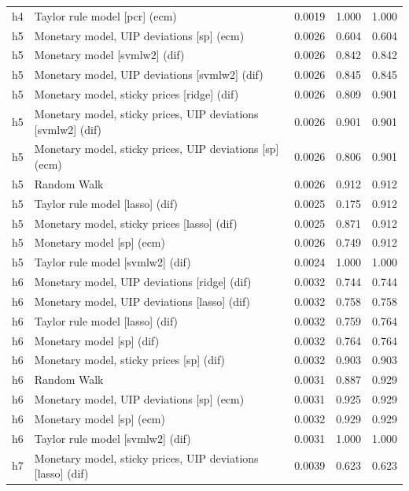\begin{ThreePartTable}
\begin{longtable}[t]{cp{5.5cm}ccc}
h4 & \raggedright Taylor rule model [pcr] (ecm) & 0.0019 & 1.000 & 1.000\\
\addlinespace
h5 & \raggedright Monetary model, UIP deviations [sp] (ecm) & 0.0026 & 0.604 & 0.604\\
h5 & \raggedright Monetary model [svmlw2] (dif) & 0.0026 & 0.842 & 0.842\\
h5 & \raggedright Monetary model, UIP deviations [svmlw2] (dif) & 0.0026 & 0.845 & 0.845\\
h5 & \raggedright Monetary model, sticky prices [ridge] (dif) & 0.0026 & 0.809 & 0.901\\
h5 & \raggedright Monetary model, sticky prices, UIP deviations [svmlw2] (dif) & 0.0026 & 0.901 & 0.901\\
h5 & \raggedright Monetary model, sticky prices, UIP deviations [sp] (ecm) & 0.0026 & 0.806 & 0.901\\
h5 & \raggedright Random Walk & 0.0026 & 0.912 & 0.912\\
h5 & \raggedright Taylor rule model [lasso] (dif) & 0.0025 & 0.175 & 0.912\\
h5 & \raggedright Monetary model, sticky prices [lasso] (dif) & 0.0025 & 0.871 & 0.912\\
h5 & \raggedright Monetary model [sp] (ecm) & 0.0026 & 0.749 & 0.912\\
h5 & \raggedright Taylor rule model [svmlw2] (dif) & 0.0024 & 1.000 & 1.000\\
\addlinespace
h6 & \raggedright Monetary model, UIP deviations [ridge] (dif) & 0.0032 & 0.744 & 0.744\\
h6 & \raggedright Monetary model, UIP deviations [lasso] (dif) & 0.0032 & 0.758 & 0.758\\
h6 & \raggedright Taylor rule model [lasso] (dif) & 0.0032 & 0.759 & 0.764\\
h6 & \raggedright Monetary model [sp] (dif) & 0.0032 & 0.764 & 0.764\\
h6 & \raggedright Monetary model, sticky prices [sp] (dif) & 0.0032 & 0.903 & 0.903\\
h6 & \raggedright Random Walk & 0.0031 & 0.887 & 0.929\\
h6 & \raggedright Monetary model, UIP deviations [sp] (ecm) & 0.0031 & 0.925 & 0.929\\
h6 & \raggedright Monetary model [sp] (ecm) & 0.0032 & 0.929 & 0.929\\
h6 & \raggedright Taylor rule model [svmlw2] (dif) & 0.0031 & 1.000 & 1.000\\
\addlinespace
h7 & \raggedright Monetary model, sticky prices, UIP deviations [lasso] (dif) & 0.0039 & 0.623 & 0.623\\

\end{longtable}
\end{ThreePartTable}
